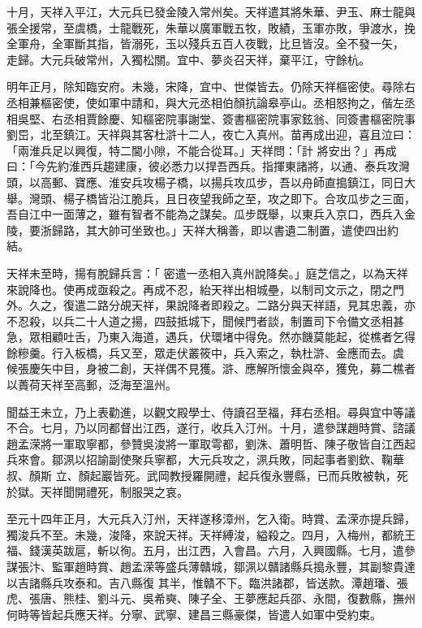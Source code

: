 \begin{pinyinscope}
 十月，天祥入平江，大元兵已發金陵入常州矣。天祥遣其將朱華、尹玉、麻士龍與張全援常，至虞橋，士龍戰死，朱華以廣軍戰五牧，敗績，玉軍亦敗，爭渡水，挽全軍舟，全軍斷其指，皆溺死，玉以殘兵五百人夜戰，比旦皆沒。全不發一矢，
 走歸。大元兵破常州，入獨松關。宜中、夢炎召天祥，棄平江，守餘杭。



 明年正月，除知臨安府。未幾，宋降，宜中、世傑皆去。仍除天祥樞密使。尋除右丞相兼樞密使，使如軍中請和，與大元丞相伯顏抗論皋亭山。丞相怒拘之，偕左丞相吳堅、右丞相賈餘慶、知樞密院事謝堂、簽書樞密院事家鉉翁、同簽書樞密院事劉岊，北至鎮江。天祥與其客杜滸十二人，夜亡入真州。苗再成出迎，喜且泣曰：「兩淮兵足以興復，特二閫小隙，不能合從耳。」天祥問：「計
 將安出？」再成曰：「今先約淮西兵趨建康，彼必悉力以捍吾西兵。指揮東諸將，以通、泰兵攻灣頭，以高郵、寶應、淮安兵攻楊子橋，以揚兵攻瓜步，吾以舟師直搗鎮江，同日大舉。灣頭、楊子橋皆沿江脆兵，且日夜望我師之至，攻之即下。合攻瓜步之三面，吾自江中一面薄之，雖有智者不能為之謀矣。瓜步既舉，以東兵入京口，西兵入金陵，要浙歸路，其大帥可坐致也。」天祥大稱善，即以書遺二制置，遣使四出約結。



 天祥未至時，揚有脫歸兵言：「
 密遣一丞相入真州說降矣。」庭芝信之，以為天祥來說降也。使再成亟殺之。再成不忍，紿天祥出相城壘，以制司文示之，閉之門外。久之，復遣二路分覘天祥，果說降者即殺之。二路分與天祥語，見其忠義，亦不忍殺，以兵二十人道之揚，四鼓抵城下，聞候門者談，制置司下令備文丞相甚急，眾相顧吐舌，乃東入海道，遇兵，伏環堵中得免。然亦饑莫能起，從樵者乞得餘糝羹。行入板橋，兵又至，眾走伏叢筱中，兵入索之，執杜滸、金應而去。虞
 候張慶矢中目，身被二創，天祥偶不見獲。滸、應解所懷金與卒，獲免，募二樵者以蕢荷天祥至高郵，泛海至溫州。



 聞益王未立，乃上表勸進，以觀文殿學士、侍讀召至福，拜右丞相。尋與宜中等議不合。七月，乃以同都督出江西，遂行，收兵入汀州。十月，遣參謀趙時賞、諮議趙孟溁將一軍取寧都，參贊吳浚將一軍取雩都，劉洙、蕭明哲、陳子敬皆自江西起兵來會。鄒洬以招諭副使聚兵寧都，大元兵攻之，洬兵敗，同起事者劉欽、鞠華叔、顏斯
 立、顏起巖皆死。武岡教授羅開禮，起兵復永豐縣，已而兵敗被執，死於獄。天祥聞開禮死，制服哭之哀。



 至元十四年正月，大元兵入汀州，天祥遂移漳州，乞入衛。時賞、孟溁亦提兵歸，獨浚兵不至。未幾，浚降，來說天祥。天祥縛浚，縊殺之。四月，入梅州，都統王福、錢漢英跋扈，斬以徇。五月，出江西，入會昌。六月，入興國縣。七月，遣參謀張汴、監軍趙時賞、趙孟溁等盛兵薄贛城，鄒洬以贛諸縣兵搗永豐，其副黎貴達以吉諸縣兵攻泰和。吉八縣復
 其半，惟贛不下。臨洪諸郡，皆送款。潭趙璠、張虎、張唐、熊桂、劉斗元、吳希奭、陳子全、王夢應起兵邵、永間，復數縣，撫州何時等皆起兵應天祥。分寧、武寧、建昌三縣豪傑，皆遣人如軍中受約束。




\end{pinyinscope}
